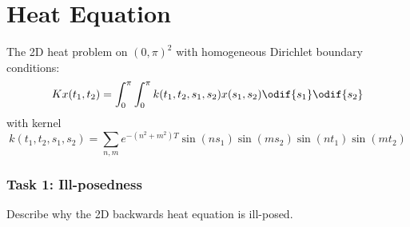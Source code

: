\frame{\titlepage}

\section{Heat Equation}%
\label{sec:heat-equation}

\begin{frame}
    \begin{problem}
     The 2D heat problem on $(0,\pi)^2$ with homogeneous Dirichlet boundary conditions:
    \[
        Kx(t_1,t_2) = \int_0^\pi \int_0^\pi k(t_1,t_2,s_1,s_2)x(s_1,s_2)\odif{s_1}\odif{s_2}
    \]
    with kernel
    \[
        k(t_1,t_2,s_1,s_2) = \sum_{n,m} e^{-(n^2+m^2)T}\sin(ns_1)\sin(ms_2)\sin(nt_1)\sin(mt_2)
    \]
    \end{problem}
\end{frame}

\begin{frame}
    \frametitle{Task 1: Ill-posedness}
    \begin{task}
        Describe why the 2D backwards heat equation is ill-posed.
    \end{task}

\end{frame}


